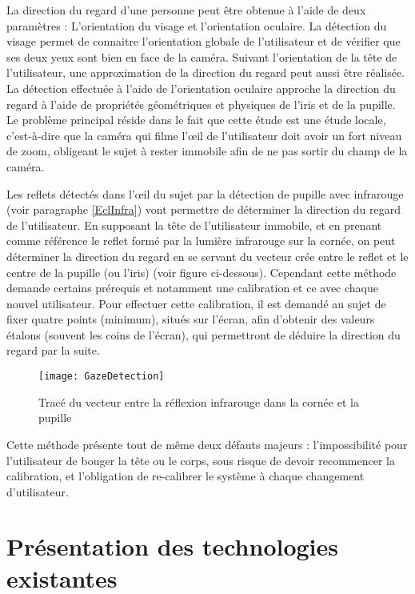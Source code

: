 La direction du regard d’une personne peut être obtenue à l’aide de deux paramètres : 
L’orientation du visage et l’orientation oculaire. La détection du visage permet de connaitre l’orientation globale de l’utilisateur et de vérifier que ses deux yeux sont bien en face de la caméra. Suivant l’orientation de la tête de l’utilisateur, une approximation de la direction du regard peut aussi être réalisée.
La détection effectuée à l’aide de l’orientation oculaire approche la direction du regard à l’aide de propriétés géométriques et physiques de l’iris et de la pupille. Le problème principal réside dans le fait que cette étude est une étude locale, c’est-à-dire que la caméra qui filme l’œil de l’utilisateur doit avoir un fort niveau de zoom, obligeant le sujet à rester immobile afin de ne pas sortir du champ de la caméra.

Les reflets détectés dans l’œil du sujet par la détection de pupille avec infrarouge (voir paragraphe \ref{EclInfra}) vont permettre de déterminer la direction du regard de l’utilisateur. En supposant la tête de l’utilisateur immobile, et en prenant comme référence le reflet formé par la lumière infrarouge sur la cornée, on peut déterminer la direction du regard en se servant du vecteur crée entre le reflet et le centre de la pupille (ou l’iris) (voir figure ci-dessous). Cependant cette méthode demande certains prérequis et notamment une calibration et ce avec chaque nouvel utilisateur. Pour effectuer cette calibration, il est demandé au sujet de fixer quatre points (minimum), situés sur l’écran, afin d’obtenir des valeurs étalons (souvent les coins de l’écran), qui permettront de déduire la direction du regard par la suite.

\begin{figure}[H]
  \centering
  \texttt{[image: GazeDetection]}
  \caption{Tracé du vecteur entre la réflexion infrarouge dans la cornée et la pupille}
  \label{fig:GazeDetection}
\end{figure}

Cette méthode présente tout de même deux défauts majeurs : l’impossibilité pour l’utilisateur de bouger la tête ou le corps, sous risque de devoir recommencer la calibration, et l’obligation de re-calibrer le système à chaque changement d’utilisateur.

\section{Présentation des technologies existantes}

